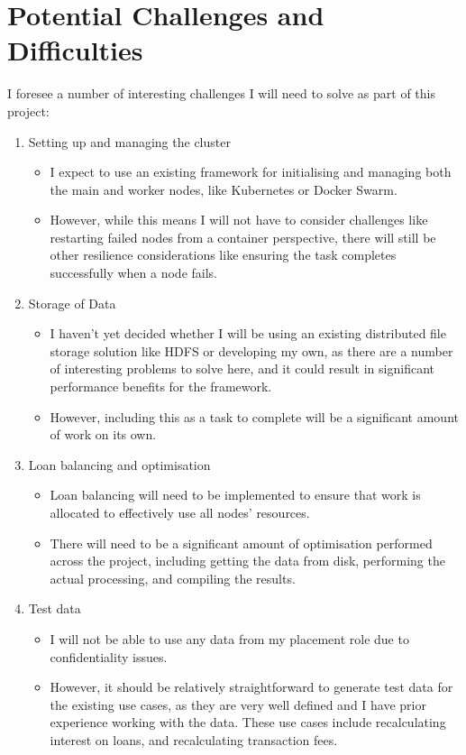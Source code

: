 \documentclass[12pt]{article}
\begin{document}
	\section{Potential Challenges and Difficulties}
	
	I foresee a number of interesting challenges I will need to solve as part of this project:
	
	\begin{enumerate}
		\item Setting up and managing the cluster
		\begin{itemize}
			\item I expect to use an existing framework for initialising and managing both the main and worker nodes, like Kubernetes or Docker Swarm.
			\item However, while this means I will not have to consider challenges like restarting failed nodes from a container perspective, there will still be other resilience considerations like ensuring the task completes successfully when a node fails. %
		\end{itemize}
		\item Storage of Data %
		\begin{itemize}
			\item I haven't yet decided whether I will be using an existing distributed file storage solution like HDFS or developing my own, as there are a number of interesting problems to solve here, and it could result in significant performance benefits for the framework.
			\item However, including this as a task to complete will be a significant amount of work on its own.
		\end{itemize}
		\item Loan balancing and optimisation
		\begin{itemize}
			\item Loan balancing will need to be implemented to ensure that work is allocated to effectively use all nodes' resources.
			\item There will need to be a significant amount of optimisation performed across the project, including getting the data from disk, performing the actual processing, and compiling the results.
		\end{itemize}
		\item Test data
		\begin{itemize}
			\item I will not be able to use any data from my placement role due to confidentiality issues.
			\item However, it should be relatively straightforward to generate test data for the existing use cases, as they are very well defined and I have prior experience working with the data. These use cases include recalculating interest on loans, and recalculating transaction fees.
		\end{itemize}
	\end{enumerate}
	
\end{document}
